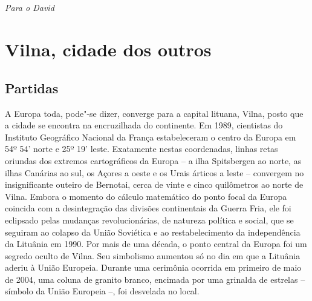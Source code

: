 \chapter*{}
\thispagestyle{empty}

\vfill
\hfill\textit{Para o David}

\part[Vilna, cidade dos outros]{Vilna, cidade dos outros}

\chapter{Partidas}

\begin{epigraphs} 
\end{epigraphs}

A Europa toda, pode"-se dizer, converge para a capital lituana, Vilna,
posto que a cidade se encontra na encruzilhada do continente. Em 1989,
cientistas do Instituto Geográfico Nacional da França estabeleceram o
centro da Europa em 54º 54' norte e 25º 19' leste. Exatamente nestas
coordenadas, linhas retas oriundas dos extremos cartográficos da Europa
-- a ilha Spitsbergen ao norte, as ilhas Canárias ao sul, os Açores a
oeste e os Urais árticos a leste -- convergem no insignificante outeiro
de Bernotai, cerca de vinte e cinco quilômetros ao norte de Vilna.
Embora o momento do cálculo matemático do ponto focal da Europa coincida
com a desintegração das divisões continentais da Guerra Fria, ele foi
eclipsado pelas mudanças revolucionárias, de natureza política e social,
que se seguiram ao colapso da União Soviética e ao restabelecimento da
independência da Lituânia em 1990. Por mais de uma década, o ponto
central da Europa foi um segredo oculto de Vilna. Seu simbolismo
aumentou só no dia em que a Lituânia aderiu à União Europeia. Durante
uma cerimônia ocorrida em primeiro de maio de 2004, uma coluna de
granito branco, encimada por uma grinalda de estrelas -- símbolo da União
Europeia --, foi desvelada no local.

